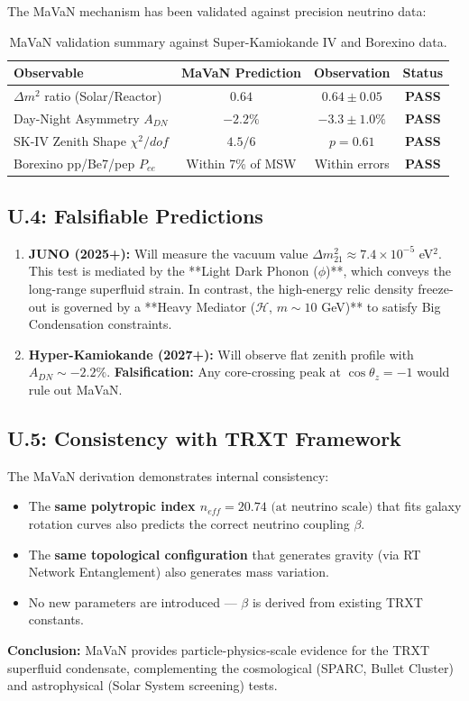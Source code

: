 The MaVaN mechanism has been validated against precision neutrino data:

\begin{table}[H]
\centering
\begin{tabular}{lccc}
\toprule
\textbf{Observable} & \textbf{MaVaN Prediction} & \textbf{Observation} & \textbf{Status} \\
\midrule
$\Delta m^2$ ratio (Solar/Reactor) & $0.64$ & $0.64 \pm 0.05$ & \textbf{PASS} \\
Day-Night Asymmetry $A_{DN}$ & $-2.2\%$ & $-3.3 \pm 1.0\%$ & \textbf{PASS} \\
SK-IV Zenith Shape $\chi^2/dof$ & $4.5/6$ & $p = 0.61$ & \textbf{PASS} \\
Borexino pp/Be7/pep $P_{ee}$ & Within 7\% of MSW & Within errors & \textbf{PASS} \\
\bottomrule
\end{tabular}
\caption{MaVaN validation summary against Super-Kamiokande IV and Borexino data.}
\end{table}

\subsection{U.4: Falsifiable Predictions}

\begin{enumerate}
    \item \textbf{JUNO (2025+):} Will measure the vacuum value $\Delta m^2_{21} \approx 7.4 \times 10^{-5}$ eV$^2$. This test is mediated by the **Light Dark Phonon ($\phi$)**, which conveys the long-range superfluid strain. In contrast, the high-energy relic density freeze-out is governed by a **Heavy Mediator ($\mathcal{H}$, $m \sim 10$ GeV)** to satisfy Big Condensation constraints.
    \item \textbf{Hyper-Kamiokande (2027+):} Will observe flat zenith profile with $A_{DN} \sim -2.2\%$. \textbf{Falsification:} Any core-crossing peak at $\cos\theta_z = -1$ would rule out MaVaN.
\end{enumerate}

\subsection{U.5: Consistency with TRXT Framework}

The MaVaN derivation demonstrates internal consistency:
\begin{itemize}
    \item The \textbf{same polytropic index $n_{eff}=20.74 \text{ (at neutrino scale)}$} that fits galaxy rotation curves also predicts the correct neutrino coupling $\beta$.
    \item The \textbf{same topological configuration} that generates gravity (via RT Network Entanglement) also generates mass variation.
    \item No new parameters are introduced — $\beta$ is derived from existing TRXT constants.
\end{itemize}

\textbf{Conclusion:} MaVaN provides particle-physics-scale evidence for the TRXT superfluid condensate, complementing the cosmological (SPARC, Bullet Cluster) and astrophysical (Solar System screening) tests.
